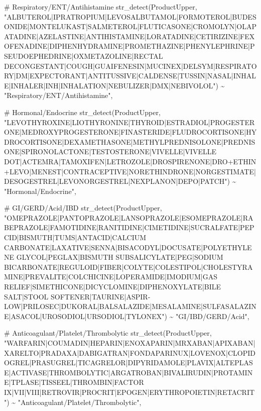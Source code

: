 \documentclass[
  letterpaper,
  DIV=11,
  numbers=noendperiod]{scrartcl}
\newenvironment{Shaded}{\begin{snugshade}}{\end{snugshade}}
\newcommand{\CommentTok}[1]{\textcolor[rgb]{0.37,0.37,0.37}{#1}}
\newcommand{\FunctionTok}[1]{\textcolor[rgb]{0.28,0.35,0.67}{#1}}
\newcommand{\NormalTok}[1]{\textcolor[rgb]{0.00,0.23,0.31}{#1}}
\newcommand{\SpecialCharTok}[1]{\textcolor[rgb]{0.37,0.37,0.37}{#1}}
\newcommand{\StringTok}[1]{\textcolor[rgb]{0.13,0.47,0.30}{#1}}
\begin{document}
\begin{Shaded}
\begin{Highlighting}[]
        \CommentTok{\# Respiratory/ENT/Antihistamine}
        \FunctionTok{str\_detect}\NormalTok{(ProductUpper, }\StringTok{"ALBUTEROL|IPRATROPIUM|LEVOSALBUTAMOL|FORMOTEROL|BUDESONIDE|MONTELUKAST|SALMETEROL|FLUTICASONE|CROMOLYN|OLAPATADINE|AZELASTINE|ANTIHISTAMINE|LORATADINE|CETIRIZINE|FEXOFENADINE|DIPHENHYDRAMINE|PROMETHAZINE|PHENYLEPHRINE|PSEUDOEPHEDRINE|OXMETAZOLINE|RECTAL DECONGESTANT|COUGH|GUAIFENESIN|MUCINEX|DELSYM|RESPIRATORY|DM|EXPECTORANT|ANTITUSSIVE|CALDENSE|TUSSIN|NASAL|INHALE|INHALER|INH|INHALATION|NEBULIZER|DMX|NEBIVOLOL"}\NormalTok{) }\SpecialCharTok{\textasciitilde{}} \StringTok{"Respiratory/ENT/Antihistamine"}\NormalTok{,}
  
        \CommentTok{\# Hormonal/Endocrine}
        \FunctionTok{str\_detect}\NormalTok{(ProductUpper, }\StringTok{"LEVOTHYROXINE|LIOTHYRONINE|THYROID|ESTRADIOL|PROGESTERONE|MEDROXYPROGESTERONE|FINASTERIDE|FLUDROCORTISONE|HYDROCORTISONE|DEXAMETHASONE|METHYLPREDNISOLONE|PREDNISONE|SPIRONOLACTONE|TESTOSTERONE|VIVELLE|VIVELLE DOT|ACTEMRA|TAMOXIFEN|LETROZOLE|DROSPIRENONE|DRO+ETHIN+LEVO|MENEST|CONTRACEPTIVE|NORETHINDRONE|NORGESTIMATE|DESOGESTREL|LEVONORGESTREL|NEXPLANON|DEPO|PATCH"}\NormalTok{) }\SpecialCharTok{\textasciitilde{}} \StringTok{"Hormonal/Endocrine"}\NormalTok{,}
  
        \CommentTok{\# GI/GERD/Acid/IBD}
        \FunctionTok{str\_detect}\NormalTok{(ProductUpper, }\StringTok{"OMEPRAZOLE|PANTOPRAZOLE|LANSOPRAZOLE|ESOMEPRAZOLE|RABEPRAZOLE|FAMOTIDINE|RANITIDINE|CIMETIDINE|SUCRALFATE|PEPCID|BISMUTH|TUMS|ANTACID|CALCIUM CARBONATE|LAXATIVE|SENNA|BISACODYL|DOCUSATE|POLYETHYLENE GLYCOL|PEGLAX|BISMUTH SUBSALICYLATE|PEG|SODIUM BICARBONATE|REGULOID|FIBER|COLYTE|COLESTIPOL|CHOLESTYRAMINE|PREVALITE|COLCHICINE|LOPERAMIDE|IMODIUM|GAS RELIEF|SIMETHICONE|DICYCLOMINE|DIPHENOXYLATE|BILE SALT|STOOL SOFTENER|TAURINE|ASPIR{-}LOW|PRILOSEC|DUKORAL|BALSALAZIDE|MESALAMINE|SULFASALAZINE|ASACOL|UROSODIOL|URSODIOL|TYLONEX"}\NormalTok{) }\SpecialCharTok{\textasciitilde{}} \StringTok{"GI/IBD/GERD/Acid"}\NormalTok{,}
  
        \CommentTok{\# Anticoagulant/Platelet/Thrombolytic}
        \FunctionTok{str\_detect}\NormalTok{(ProductUpper, }\StringTok{"WARFARIN|COUMADIN|HEPARIN|ENOXAPARIN|MRXABAN|APIXABAN|XARELTO|PRADAXA|DABIGATRAN|FONDAPARINUX|LOVENOX|CLOPIDOGREL|PRASUGREL|TICAGRELOR|DIPYRIDAMOLE|PLAVIX|ALTEPLASE|ACTIVASE|THROMBOLYTIC|ARGATROBAN|BIVALIRUDIN|PROTAMINE|TPLASE|TISSEEL|THROMBIN|FACTOR IX|VII|VIII|RETROVIR|PROCRIT|EPOGEN|ERYTHROPOIETIN|RETACRIT"}\NormalTok{) }\SpecialCharTok{\textasciitilde{}} \StringTok{"Anticoagulant/Platelet/Thrombolytic"}\NormalTok{,}
  

\end{Highlighting}
\end{Shaded}
\end{document}
